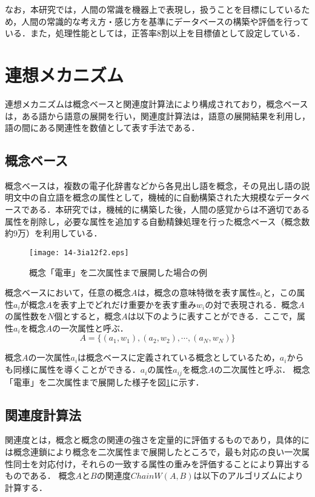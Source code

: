 \documentclass[japanese]{jnlp_1.3a}
\begin{document}
なお，本研究では，人間の常識を機器上で表現し，扱うことを目標にしているため，人間の常識的な考え方・感じ方を基準にデータベースの構築や評価を行っている．また，処理性能としては，正答率8割以上を目標値として設定している．



\section{連想メカニズム}\label{association_mechanism}
連想メカニズムは概念ベースと関連度計算法により構成されており，概念ベース\cite{hirose:02,kojima:02}は，ある語から語意の展開を行い，関連度計算法\cite{watabe:01}は，語意の展開結果を利用し，語の間にある関連性を数値として表す手法である．


\subsection{概念ベース}\label{consept_base}
概念ベースは，複数の電子化辞書などから各見出し語を概念，その見出し語の説明文中の自立語を概念の属性として，機械的に自動構築された大規模なデータベースである．本研究では，機械的に構築した後，人間の感覚からは不適切である属性を削除し，必要な属性を追加する自動精錬処理を行った概念ベース（概念数約9万）\cite{hirose:02}を利用している．

\begin{figure}[b]
\begin{center}
    \texttt{[image: 14-3ia12f2.eps]}
\end{center}
\caption{概念「電車」を二次属性まで展開した場合の例}
\label{concept_base}
\end{figure}

概念ベースにおいて，任意の概念$A$は，概念の意味特徴を表す属性$a_i$と，この属性$a_i$が概念$A$を表す上でどれだけ重要かを表す重み$w_i$の対で表現される．概念$A$の属性数を$N$個とすると，概念$A$は以下のように表すことができる．ここで，属性$a_i$を概念$A$の一次属性と呼ぶ．
\[
A = \{ (a_1, w_1), (a_2, w_2), \cdots, (a_N, w_N) \}
\]

概念$A$の一次属性$a_i$は概念ベースに定義されている概念としているため，$a_i$からも同様に属性を導くことができる．$a_i$の属性$a_{ij}$を概念$A$の二次属性と呼ぶ．
概念「電車」を二次属性まで展開した様子を図\ref{concept_base}に示す．



\subsection{関連度計算法}\label{ra}
関連度とは，概念と概念の関連の強さを定量的に評価するものであり，具体的には概念連鎖により概念を二次属性まで展開したところで，最も対応の良い一次属性同士を対応付け，それらの一致する属性の重みを評価することにより算出するものである．
概念$A$と$B$の関連度$ChainW(A,B)$は以下のアルゴリズムにより計算する\cite{watabe:01}．
\end{document}
